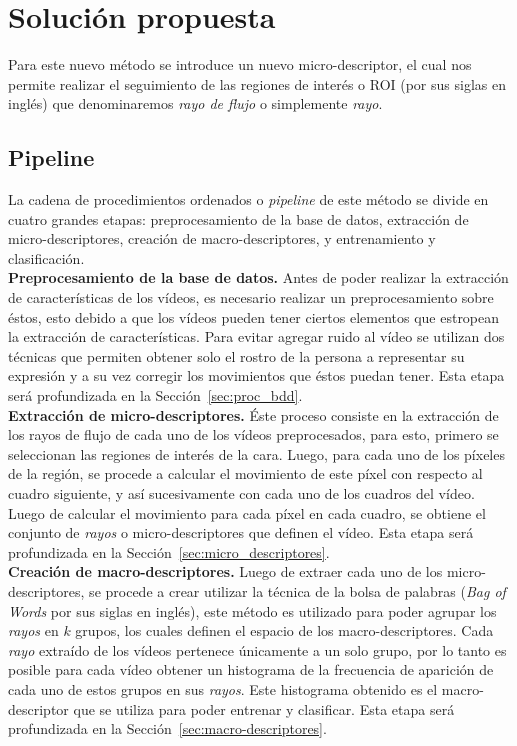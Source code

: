 \section{Solución propuesta}
\label{sec:solucion}

Para este nuevo método se introduce un nuevo micro-descriptor, el cual nos permite realizar el seguimiento de las regiones de interés o ROI (por sus siglas en inglés) que denominaremos \textit{rayo de flujo} o simplemente \textit{rayo}.


\subsection{Pipeline}

La cadena de procedimientos ordenados o \textit{pipeline} de este método se divide en cuatro grandes etapas: preprocesamiento de la base de datos, extracción de micro-descriptores, creación de macro-descriptores, y entrenamiento y clasificación.\\

\textbf{Preprocesamiento de la base de datos.}
Antes de poder realizar la extracción de características de los vídeos, es necesario realizar un preprocesamiento sobre éstos, esto debido a que los vídeos pueden tener ciertos elementos que estropean la extracción de características. Para evitar agregar ruido al vídeo se utilizan dos técnicas que permiten obtener solo el rostro de la persona a representar su expresión y a su vez corregir los movimientos que éstos puedan tener. Esta etapa será profundizada en la Sección~\ref{sec:proc_bdd}.\\


\textbf{Extracción de micro-descriptores.}
Éste proceso consiste en la extracción de los rayos de flujo de cada uno de los vídeos preprocesados, para esto, primero se seleccionan las regiones de interés de la cara. Luego, para cada uno de los píxeles de la región, se procede a calcular el movimiento de este píxel con respecto al cuadro siguiente, y así sucesivamente con cada uno de los cuadros del vídeo. Luego de calcular el movimiento para cada píxel en cada cuadro, se obtiene el conjunto de \textit{rayos} o micro-descriptores que definen el vídeo. Esta etapa será profundizada en la Sección~\ref{sec:micro_descriptores}.\\


\textbf{Creación de macro-descriptores.}
Luego de extraer cada uno de los micro-descriptores, se procede a crear utilizar la técnica de la bolsa de palabras (\textit{Bag of Words} por sus siglas en inglés), este método es utilizado para poder agrupar los \textit{rayos} en $k$ grupos, los cuales definen el espacio de los macro-descriptores. Cada \textit{rayo} extraído de los vídeos pertenece únicamente a un solo grupo, por lo tanto es posible para cada vídeo obtener un histograma de la frecuencia de aparición de cada uno de estos grupos en sus \textit{rayos}. Este histograma obtenido es el macro-descriptor que se utiliza para poder entrenar y clasificar. Esta etapa será profundizada en la Sección~\ref{sec:macro-descriptores}.\\


